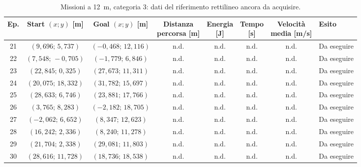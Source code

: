\begin{table}[H]
\centering
\caption{Missioni a 12~m, categoria 3: dati del riferimento rettilineo ancora da acquisire.}
\label{tab:big-map-12m-baseline-cat3}
\begingroup
\fontsize{9}{11}\selectfont
\setlength{\tabcolsep}{2.5pt}
\renewcommand{\arraystretch}{1.2}
\begin{tabular}{@{}c cc cccc l@{}}
\toprule
Ep. & \shortstack{Start $(x;y)$\\{}[m]} & \shortstack{Goal $(x;y)$\\{}[m]} & \shortstack{Distanza\\percorsa [m]} & \shortstack{Energia\\{}[J]} & \shortstack{Tempo\\{}[s]} & \shortstack{Velocità\\media [m/s]} & Esito \\
\midrule
21 & $(9{,}696;\,5{,}737)$ & $(-0{,}468;\,12{,}116)$ & n.d. & n.d. & n.d. & n.d. & Da eseguire \\
22 & $(7{,}548;\,-0{,}705)$ & $(-1{,}779;\,6{,}846)$ & n.d. & n.d. & n.d. & n.d. & Da eseguire \\
23 & $(22{,}845;\,0{,}325)$ & $(27{,}673;\,11{,}311)$ & n.d. & n.d. & n.d. & n.d. & Da eseguire \\
24 & $(20{,}075;\,18{,}332)$ & $(31{,}782;\,15{,}697)$ & n.d. & n.d. & n.d. & n.d. & Da eseguire \\
25 & $(28{,}633;\,6{,}746)$ & $(23{,}881;\,17{,}766)$ & n.d. & n.d. & n.d. & n.d. & Da eseguire \\
26 & $(3{,}765;\,8{,}283)$ & $(-2{,}182;\,18{,}705)$ & n.d. & n.d. & n.d. & n.d. & Da eseguire \\
27 & $(-2{,}062;\,6{,}652)$ & $(8{,}347;\,12{,}623)$ & n.d. & n.d. & n.d. & n.d. & Da eseguire \\
28 & $(16{,}242;\,2{,}336)$ & $(8{,}240;\,11{,}278)$ & n.d. & n.d. & n.d. & n.d. & Da eseguire \\
29 & $(21{,}704;\,2{,}338)$ & $(29{,}081;\,11{,}803)$ & n.d. & n.d. & n.d. & n.d. & Da eseguire \\
30 & $(28{,}616;\,11{,}728)$ & $(18{,}736;\,18{,}538)$ & n.d. & n.d. & n.d. & n.d. & Da eseguire \\
\bottomrule
\end{tabular}
\endgroup
\end{table}

